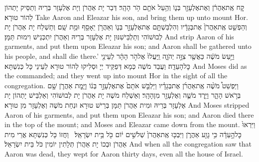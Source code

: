 {קַ֚ח אֶֽת\maqqaf אַהֲרֹ֔ן וְאֶת\maqqaf אֶלְעָזָ֖ר בְּנ֑וֹ וְהַ֥עַל אֹתָ֖ם הֹ֥ר הָהָֽר׃}
{דְּבַר יָת אַהֲרֹן וְיָת אֶלְעָזָר בְּרֵיהּ וְתַסֵּיק יָתְהוֹן לְהוֹר טוּרָא׃}
{Take Aaron and Eleazar his son, and bring them up unto mount Hor.}{}
{וְהַפְשֵׁ֤ט אֶֽת\maqqaf אַהֲרֹן֙ אֶת\maqqaf בְּגָדָ֔יו וְהִלְבַּשְׁתָּ֖ם אֶת\maqqaf אֶלְעָזָ֣ר בְּנ֑וֹ וְאַהֲרֹ֥ן יֵאָסֵ֖ף וּמֵ֥ת שָֽׁם׃}
{וְתַשְׁלַח יָת אַהֲרֹן יָת לְבוּשׁוֹהִי וְתַלְבֵּישִׁנּוּן יָת אֶלְעָזָר בְּרֵיהּ וְאַהֲרֹן יִתְכְּנֵישׁ וִימוּת תַּמָּן׃}
{And strip Aaron of his garments, and put them upon Eleazar his son; and Aaron shall be gathered unto his people, and shall die there.’}{}
{וַיַּ֣עַשׂ מֹשֶׁ֔ה כַּאֲשֶׁ֖ר צִוָּ֣ה יְהֹוָ֑ה וַֽיַּעֲלוּ֙ אֶל\maqqaf הֹ֣ר הָהָ֔ר לְעֵינֵ֖י כׇּל\maqqaf הָעֵדָֽה׃}
{וַעֲבַד מֹשֶׁה כְּמָא דְּפַקֵּיד יְיָ וּסְלִיקוּ לְהוֹר טוּרָא לְעֵינֵי כָּל כְּנִשְׁתָּא׃}
{And Moses did as the \lord\space commanded; and they went up into mount Hor in the sight of all the congregation.}{}
{וַיַּפְשֵׁט֩ מֹשֶׁ֨ה אֶֽת\maqqaf אַהֲרֹ֜ן אֶת\maqqaf בְּגָדָ֗יו וַיַּלְבֵּ֤שׁ אֹתָם֙ אֶת\maqqaf אֶלְעָזָ֣ר בְּנ֔וֹ וַיָּ֧מׇת אַהֲרֹ֛ן שָׁ֖ם בְּרֹ֣אשׁ הָהָ֑ר וַיֵּ֧רֶד מֹשֶׁ֛ה וְאֶלְעָזָ֖ר מִן\maqqaf הָהָֽר׃}
{וְאַשְׁלַח מֹשֶׁה יָת אַהֲרֹן יָת לְבוּשׁוֹהִי וְאַלְבֵּישׁ יָתְהוֹן יָת אֶלְעָזָר בְּרֵיהּ וּמִית אַהֲרֹן תַּמָּן בְּרֵישׁ טוּרָא וּנְחַת מֹשֶׁה וְאֶלְעָזָר מִן טוּרָא׃}
{And Moses stripped Aaron of his garments, and put them upon Eleazar his son; and Aaron died there in the top of the mount; and Moses and Eleazar came down from the mount.}{}
{וַיִּרְאוּ֙ כׇּל\maqqaf הָ֣עֵדָ֔ה כִּ֥י גָוַ֖ע אַהֲרֹ֑ן וַיִּבְכּ֤וּ אֶֽת\maqqaf אַהֲרֹן֙ שְׁלֹשִׁ֣ים י֔וֹם כֹּ֖ל בֵּ֥ית יִשְׂרָאֵֽל׃ \setuma }
{וַחֲזוֹ כָּל כְּנִשְׁתָּא אֲרֵי מִית אַהֲרֹן וּבְכוֹ יָת אַהֲרֹן תְּלָתִין יוֹמִין כֹּל בֵּית יִשְׂרָאֵל׃}
{And when all the congregation saw that Aaron was dead, they wept for Aaron thirty days, even all the house of Israel.}{}
